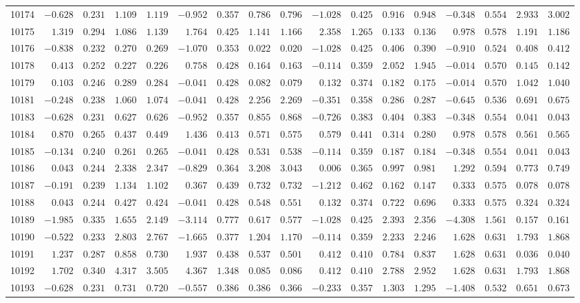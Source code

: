 \begin{landscape}
{\begin{longtable}{l|rrrr|rrrr|rrrr|rrrr}
10174&$-0.628$&$0.231$&$1.109$&$1.119$&$-0.952$&$0.357$&$0.786$&$0.796$&$-1.028$&$0.425$&$0.916$&$0.948$&$-0.348$&$0.554$&$2.933$&$3.002$\tabularnewline
10175&$ 1.319$&$0.294$&$1.086$&$1.139$&$ 1.764$&$0.425$&$1.141$&$1.166$&$ 2.358$&$1.265$&$0.133$&$0.136$&$ 0.978$&$0.578$&$1.191$&$1.186$\tabularnewline
10176&$-0.838$&$0.232$&$0.270$&$0.269$&$-1.070$&$0.353$&$0.022$&$0.020$&$-1.028$&$0.425$&$0.406$&$0.390$&$-0.910$&$0.524$&$0.408$&$0.412$\tabularnewline
10178&$ 0.413$&$0.252$&$0.227$&$0.226$&$ 0.758$&$0.428$&$0.164$&$0.163$&$-0.114$&$0.359$&$2.052$&$1.945$&$-0.014$&$0.570$&$0.145$&$0.142$\tabularnewline
10179&$ 0.103$&$0.246$&$0.289$&$0.284$&$-0.041$&$0.428$&$0.082$&$0.079$&$ 0.132$&$0.374$&$0.182$&$0.175$&$-0.014$&$0.570$&$1.042$&$1.040$\tabularnewline
10181&$-0.248$&$0.238$&$1.060$&$1.074$&$-0.041$&$0.428$&$2.256$&$2.269$&$-0.351$&$0.358$&$0.286$&$0.287$&$-0.645$&$0.536$&$0.691$&$0.675$\tabularnewline
10183&$-0.628$&$0.231$&$0.627$&$0.626$&$-0.952$&$0.357$&$0.855$&$0.868$&$-0.726$&$0.383$&$0.404$&$0.383$&$-0.348$&$0.554$&$0.041$&$0.043$\tabularnewline
10184&$ 0.870$&$0.265$&$0.437$&$0.449$&$ 1.436$&$0.413$&$0.571$&$0.575$&$ 0.579$&$0.441$&$0.314$&$0.280$&$ 0.978$&$0.578$&$0.561$&$0.565$\tabularnewline
10185&$-0.134$&$0.240$&$0.261$&$0.265$&$-0.041$&$0.428$&$0.531$&$0.538$&$-0.114$&$0.359$&$0.187$&$0.184$&$-0.348$&$0.554$&$0.041$&$0.043$\tabularnewline
10186&$ 0.043$&$0.244$&$2.338$&$2.347$&$-0.829$&$0.364$&$3.208$&$3.043$&$ 0.006$&$0.365$&$0.997$&$0.981$&$ 1.292$&$0.594$&$0.773$&$0.749$\tabularnewline
10187&$-0.191$&$0.239$&$1.134$&$1.102$&$ 0.367$&$0.439$&$0.732$&$0.732$&$-1.212$&$0.462$&$0.162$&$0.147$&$ 0.333$&$0.575$&$0.078$&$0.078$\tabularnewline
10188&$ 0.043$&$0.244$&$0.427$&$0.424$&$-0.041$&$0.428$&$0.548$&$0.551$&$ 0.132$&$0.374$&$0.722$&$0.696$&$ 0.333$&$0.575$&$0.324$&$0.324$\tabularnewline
10189&$-1.985$&$0.335$&$1.655$&$2.149$&$-3.114$&$0.777$&$0.617$&$0.577$&$-1.028$&$0.425$&$2.393$&$2.356$&$-4.308$&$1.561$&$0.157$&$0.161$\tabularnewline
10190&$-0.522$&$0.233$&$2.803$&$2.767$&$-1.665$&$0.377$&$1.204$&$1.170$&$-0.114$&$0.359$&$2.233$&$2.246$&$ 1.628$&$0.631$&$1.793$&$1.868$\tabularnewline
10191&$ 1.237$&$0.287$&$0.858$&$0.730$&$ 1.937$&$0.438$&$0.537$&$0.501$&$ 0.412$&$0.410$&$0.784$&$0.837$&$ 1.628$&$0.631$&$0.036$&$0.040$\tabularnewline
10192&$ 1.702$&$0.340$&$4.317$&$3.505$&$ 4.367$&$1.348$&$0.085$&$0.086$&$ 0.412$&$0.410$&$2.788$&$2.952$&$ 1.628$&$0.631$&$1.793$&$1.868$\tabularnewline
10193&$-0.628$&$0.231$&$0.731$&$0.720$&$-0.557$&$0.386$&$0.386$&$0.366$&$-0.233$&$0.357$&$1.303$&$1.295$&$-1.408$&$0.532$&$0.651$&$0.673$\tabularnewline

\end{longtable}}
\end{landscape}

